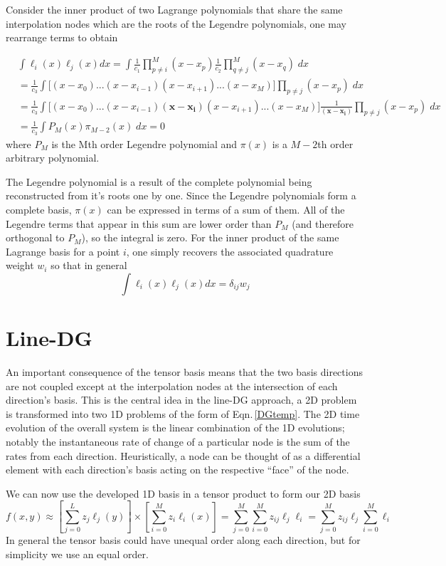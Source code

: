 \documentclass[letterpaper,12pt]{report}
\newcommand{\be}{\begin{equation}}
\newcommand{\ee}{\end{equation}}
\begin{document}
Consider the inner product of two Lagrange polynomials that share the same interpolation nodes which are the roots of the Legendre polynomials, one may rearrange terms to obtain

\be \begin{split} &\int \ell_i(x) \ell_j(x) dx = \int \frac{1}{c_1} \prod_{p\neq i}^M (x-x_p) \frac{1}{c_2}\prod_{q \neq j}^M (x-x_q) \;dx \\ 
&=\frac{1}{c_3} \int  \Big[(x-x_0)...(x-x_{i-1})(x-x_{i+1})...(x-x_M)\Big]\prod_{p \neq j} (x-x_p) \;dx\\
&=\frac{1}{c_3} \int  \Big[(x-x_0)...(x-x_{i-1}) \boldsymbol{(x-x_i)}(x-x_{i+1})...(x-x_M)\Big] \frac{1}{\boldsymbol{(x-x_i)}}\prod_{p \neq j} (x-x_p) \;dx\\
&=\frac{1}{c_3} \int  P_M(x) \pi_{M-2}(x) \;dx= 0\end{split}\ee
where $P_M$ is the Mth order Legendre polynomial and $\pi(x)$ is a $M-2$th order arbitrary polynomial.

The Legendre polynomial is a result of the complete polynomial being reconstructed from it's roots one by one. Since the Legendre polynomials form a complete basis, $\pi(x)$ can be expressed in terms of a sum of them. All of the Legendre terms that appear in this sum are lower order than $P_M$ (and therefore orthogonal to $P_M$), so the integral is zero. For the inner product of the same Lagrange basis for a point $i$, one simply recovers the associated quadrature weight $w_i$ so that in general
\be \int \ell_i(x) \ell_j(x) dx = \delta_{ij} w_j \ee

%
\section{Line-DG}
An important consequence of the tensor basis means that the two basis directions are not coupled except at the interpolation nodes at the intersection of each direction's basis. This is the central idea in the line-DG \cite{Persson2013} approach, a 2D problem is transformed into two 1D problems of the form of Eqn.\,\eqref{DGtemp}. The 2D time evolution of the overall system is the linear combination of the 1D evolutions; notably the instantaneous rate of change of a particular node is the sum of the rates from each direction. Heuristically, a node can be thought of as a differential element with each direction's basis acting on the respective ``face'' of the node.

We can now use the developed 1D basis in a tensor product to form our 2D basis
\be f(x,y) \approx \left[\sum_{j=0}^L z_j \ell_j(y) \right] \times \left[ \sum_{i=0}^M z_i \ell_i(x) \right] = \sum_{j=0}^M \sum_{i=0}^M z_{ij} \ell_j \ell_i =  \sum_{j=0}^M z_{ij} \ell_j \sum_{i=0}^M  \ell_i \ee
In general the tensor basis could have unequal order along each direction, but for simplicity we use an equal order.
\end{document}
